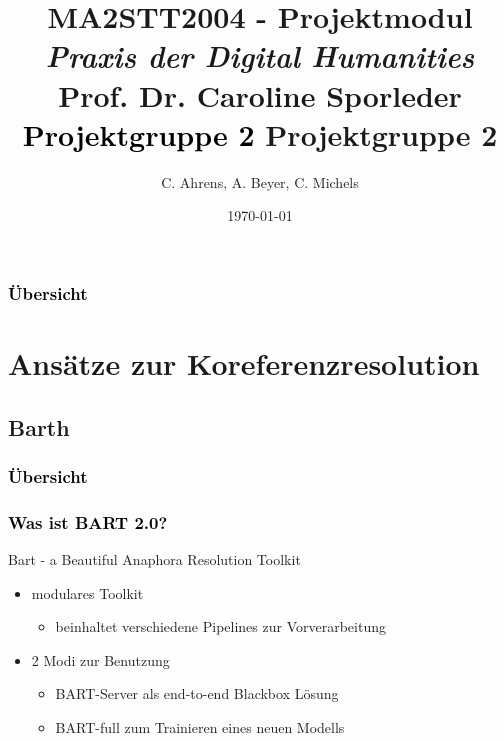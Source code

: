 \documentclass[xcolor=dvipsnames]{beamer}
\title{{\scriptsize{MA2STT2004 - Projektmodul\newline
\\\emph{Praxis der Digital Humanities}
\\Prof. Dr. Caroline Sporleder}}
\newline\\\textcolor{black}{\huge{Projektgruppe 2\newline
}}}
\author{C. Ahrens, A. Beyer, C. Michels}
\institute{Fachbereich II --  Computerlinguistik und Digital Humanities
\newline\\Universität Trier}
\date{\today}
\begin{document}
\begin{frame}[plain]
\titlepage
\end{frame}

\title{Projektgruppe 2}
\institute{}

\begin{frame}[plain]\frametitle{\textcolor{black}{Übersicht}}
\tableofcontents[hideallsubsections]
\end{frame}


\section{Ansätze zur Koreferenzresolution}


\subsection{Barth}


\begin{frame}[plain]\frametitle{\textcolor{black}{Übersicht}}


\end{frame}

\addtocounter{framenumber}{-3}


\begin{frame}\frametitle{\textcolor{black}{Was ist BART 2.0?}}

\begin{block}{Bart - a Beautiful Anaphora Resolution Toolkit}
\begin{itemize}
\item modulares Toolkit 
\begin{itemize}
\item beinhaltet verschiedene Pipelines zur Vorverarbeitung
\end{itemize}
\item 2 Modi zur Benutzung
\begin{itemize}
\item BART-Server als end-to-end Blackbox Lösung
\item BART-full zum Trainieren eines neuen Modells
\end{itemize}
\end{itemize}
\end{block}

\end{frame}
\end{document}
